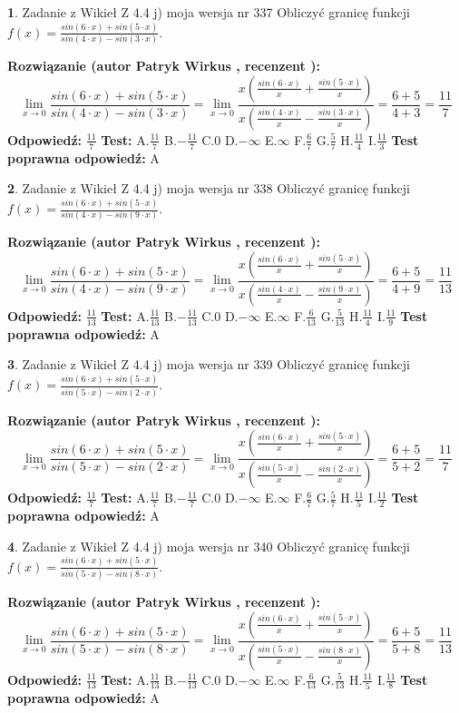 \documentclass[12pt, a4paper]{article}
\theoremstyle{definition} %
\newtheorem{zad}{}
\newcommand{\zadStart}[1]{\begin{zad}#1\newline}
\newcommand{\zadStop}{\end{zad}}
\newcommand{\rozwStart}[2]{\noindent \textbf{Rozwiązanie (autor #1 , recenzent #2): }\newline}
\newcommand{\rozwStop}{\newline}
\newcommand{\odpStart}{\noindent \textbf{Odpowiedź:}\newline}
\newcommand{\odpStop}{\newline}
\newcommand{\testStart}{\noindent \textbf{Test:}\newline}
\newcommand{\testStop}{\newline}
\newcommand{\kluczStart}{\noindent \textbf{Test poprawna odpowiedź:}\newline}
\newcommand{\kluczStop}{\newline}
\begin{document}
\zadStart{Zadanie z Wikieł Z 4.4 j) moja wersja nr 337}
Obliczyć granicę funkcji $f(x)=\frac{sin(6\cdot x) +sin(5\cdot x)}{sin(4\cdot x) -sin(3\cdot x)}$.
\zadStop
\rozwStart{Patryk Wirkus}{}
$$\lim\limits_{x\to 0}\frac{sin(6\cdot x) +sin(5\cdot x)}{sin(4\cdot x) -sin(3\cdot x)}=\lim\limits_{x\to 0}\frac{x(\frac{sin(6\cdot x)}{x}+\frac{sin(5\cdot x)}{x})}{x(\frac{sin(4\cdot x)}{x}-\frac{sin(3\cdot x)}{x})}=\frac{6+5}{4+3} = \frac{11}{7}$$
\rozwStop
\odpStart
$\frac{11}{7}$
\odpStop
\testStart
A.$\frac{11}{7}$
B.$-\frac{11}{7}$
C.$0$
D.$-\infty$
E.$\infty$
F.$\frac{6}{7}$
G.$\frac{5}{7}$
H.$\frac{11}{4}$
I.$\frac{11}{3}$
\testStop
\kluczStart
A
\kluczStop



\zadStart{Zadanie z Wikieł Z 4.4 j) moja wersja nr 338}
Obliczyć granicę funkcji $f(x)=\frac{sin(6\cdot x) +sin(5\cdot x)}{sin(4\cdot x) -sin(9\cdot x)}$.
\zadStop
\rozwStart{Patryk Wirkus}{}
$$\lim\limits_{x\to 0}\frac{sin(6\cdot x) +sin(5\cdot x)}{sin(4\cdot x) -sin(9\cdot x)}=\lim\limits_{x\to 0}\frac{x(\frac{sin(6\cdot x)}{x}+\frac{sin(5\cdot x)}{x})}{x(\frac{sin(4\cdot x)}{x}-\frac{sin(9\cdot x)}{x})}=\frac{6+5}{4+9} = \frac{11}{13}$$
\rozwStop
\odpStart
$\frac{11}{13}$
\odpStop
\testStart
A.$\frac{11}{13}$
B.$-\frac{11}{13}$
C.$0$
D.$-\infty$
E.$\infty$
F.$\frac{6}{13}$
G.$\frac{5}{13}$
H.$\frac{11}{4}$
I.$\frac{11}{9}$
\testStop
\kluczStart
A
\kluczStop



\zadStart{Zadanie z Wikieł Z 4.4 j) moja wersja nr 339}
Obliczyć granicę funkcji $f(x)=\frac{sin(6\cdot x) +sin(5\cdot x)}{sin(5\cdot x) -sin(2\cdot x)}$.
\zadStop
\rozwStart{Patryk Wirkus}{}
$$\lim\limits_{x\to 0}\frac{sin(6\cdot x) +sin(5\cdot x)}{sin(5\cdot x) -sin(2\cdot x)}=\lim\limits_{x\to 0}\frac{x(\frac{sin(6\cdot x)}{x}+\frac{sin(5\cdot x)}{x})}{x(\frac{sin(5\cdot x)}{x}-\frac{sin(2\cdot x)}{x})}=\frac{6+5}{5+2} = \frac{11}{7}$$
\rozwStop
\odpStart
$\frac{11}{7}$
\odpStop
\testStart
A.$\frac{11}{7}$
B.$-\frac{11}{7}$
C.$0$
D.$-\infty$
E.$\infty$
F.$\frac{6}{7}$
G.$\frac{5}{7}$
H.$\frac{11}{5}$
I.$\frac{11}{2}$
\testStop
\kluczStart
A
\kluczStop



\zadStart{Zadanie z Wikieł Z 4.4 j) moja wersja nr 340}
Obliczyć granicę funkcji $f(x)=\frac{sin(6\cdot x) +sin(5\cdot x)}{sin(5\cdot x) -sin(8\cdot x)}$.
\zadStop
\rozwStart{Patryk Wirkus}{}
$$\lim\limits_{x\to 0}\frac{sin(6\cdot x) +sin(5\cdot x)}{sin(5\cdot x) -sin(8\cdot x)}=\lim\limits_{x\to 0}\frac{x(\frac{sin(6\cdot x)}{x}+\frac{sin(5\cdot x)}{x})}{x(\frac{sin(5\cdot x)}{x}-\frac{sin(8\cdot x)}{x})}=\frac{6+5}{5+8} = \frac{11}{13}$$
\rozwStop
\odpStart
$\frac{11}{13}$
\odpStop
\testStart
A.$\frac{11}{13}$
B.$-\frac{11}{13}$
C.$0$
D.$-\infty$
E.$\infty$
F.$\frac{6}{13}$
G.$\frac{5}{13}$
H.$\frac{11}{5}$
I.$\frac{11}{8}$
\testStop
\kluczStart
A
\kluczStop
\end{document}

